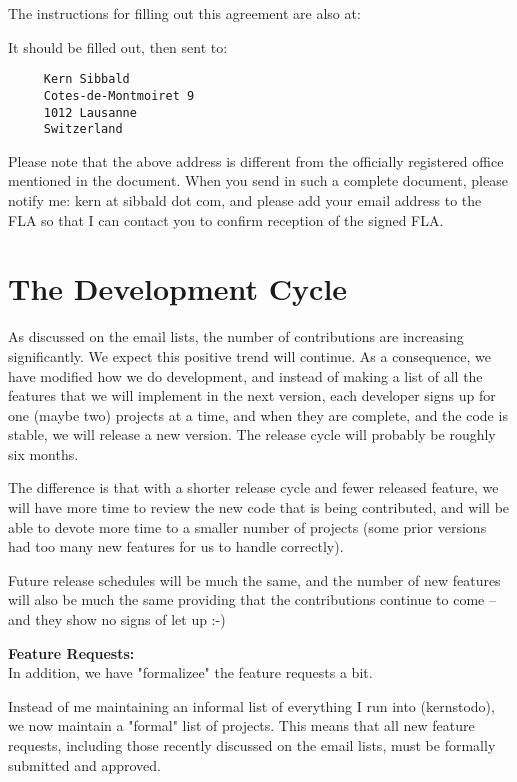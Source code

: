 The instructions for filling out this agreement are also at:

It should be filled out, then sent to:

\begin{verbatim}
     Kern Sibbald
     Cotes-de-Montmoiret 9
     1012 Lausanne
     Switzerland
\end{verbatim}

Please note that the above address is different from the officially
registered office mentioned in the document.  When you send in such a
complete document, please notify me: kern at sibbald dot com, and
please add your email address to the FLA so that I can contact you
to confirm reception of the signed FLA.


\section{The Development Cycle}

As discussed on the email lists, the number of contributions are
increasing significantly.  We expect this positive trend
will continue.  As a consequence, we have modified how we do
development, and instead of making a list of all the features that we will
implement in the next version, each developer signs up for one (maybe
two) projects at a time, and when they are complete, and the code
is stable, we will release a new version.  The release cycle will probably
be roughly six months.

The difference is that with a shorter release cycle and fewer released
feature, we will have more time to review the new code that is being
contributed, and will be able to devote more time to a smaller number of
projects (some prior versions had too many new features for us to handle
correctly).

Future release schedules will be much the same, and the
number of new features will also be much the same providing that the
contributions continue to come -- and they show no signs of let up :-)

{\bf Feature Requests:} \\
In addition, we have "formalizee" the feature requests a bit.

Instead of me maintaining an informal list of everything I run into
(kernstodo), we now maintain a "formal" list of projects.  This
means that all new feature requests, including those recently discussed on
the email lists, must be formally submitted and approved.

